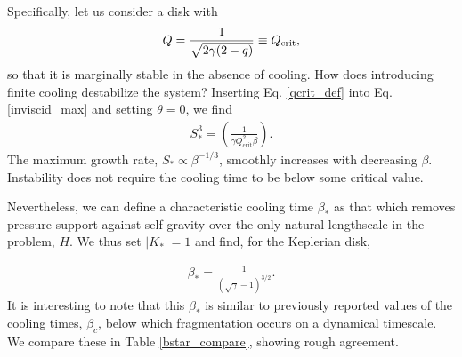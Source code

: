 
Specifically, let us consider a disk with 
\begin{align}\label{qcrit_def}
  Q = \frac{1}{\sqrt{2\gamma(2-q)}}\equiv Q_{\mathrm{crit}},
\end{align} 
so that it is marginally stable in the absence of cooling.  
How does introducing finite cooling destabilize the system? 
Inserting Eq. \ref{qcrit_def} into Eq. \ref{inviscid_max} and setting
$\theta=0$, we find 
\begin{align}\label{sstar}
  S_*^3 = \left(\frac{1}{\gamma Q_\mathrm{crit}^2 \beta}\right). 
\end{align}
The maximum growth rate, $S_*\propto \beta^{-1/3}$, smoothly
increases with decreasing $\beta$. Instability does not require the
cooling time to be below some 
critical value. 

Nevertheless, we can define a characteristic cooling
time $\beta_*$ as that which removes pressure support against
self-gravity over the only natural lengthscale in the problem, $H$. We
thus set $|K_*|=1$ and find, for the Keplerian disk, 

\begin{align}\label{betastar}
  \beta_* = \frac{1}{\left(\sqrt{\gamma} - 1\right)^{3/2}}. 
\end{align}
It is interesting to note that this $\beta_*$ is similar to previously reported 
values of the cooling times, $\beta_c$, below which fragmentation
occurs on a dynamical timescale. We compare these in Table
\ref{bstar_compare}, showing rough agreement. 



